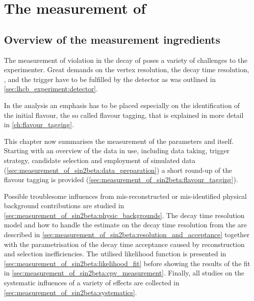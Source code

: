 
\chapter[
  head={The measurement of \sintwobetait},
  tocentry={The measurement of \sintwobetabfsfHyperref}
]
{The measurement of \sintwobetabfsf}
\label{ch:measurement_of_sin2beta}

\section{Overview of the measurement ingredients}
\label{sec:measurement_of_sin2beta:overview}

The measurement of \CP violation in the decay of \BdToJpsiKS poses a variety of
challenges to the experimenter. Great demands on the vertex resolution, the
decay time resolution, \PID, and the trigger have to be fulfilled by the \LHCb
detector as was outlined in \cref{sec:lhcb_experiment:detector}.

In the analysis an emphasis has to be placed especially on the identification of
the initial \Bmeson flavour, the so called flavour tagging, that is explained in
more detail in \cref{ch:flavour_tagging}.

This chapter now summarises the measurement of the \CP parameters \SJpsiKS and
\CJpsiKS itself. Starting with an overview of the data in use, including data
taking, trigger strategy, candidate selection and employment of simulated data
(\cref{sec:measurement_of_sin2beta:data_preparation}) a short round-up of the
flavour tagging is provided (\cref{sec:measurement_of_sin2beta:flavour_tagging}). 

Possible troublesome influences from mis-reconstructed or mis-identified
physical background contributions are studied in
\cref{sec:measurement_of_sin2beta:physic_backgrounds}. The decay time resolution
model and how to handle the estimate on the decay time resolution from the \DTF
are described in
\cref{sec:measurement_of_sin2beta:resolution_and_acceptance} together with
the parametrisation of the decay time acceptance caused by reconstruction and
selection inefficiencies. The utilised likelihood function is presented in
\cref{sec:measurement_of_sin2beta:likelihood_fit} before showing the results of
the fit in \cref{sec:measurement_of_sin2beta:cpv_measurement}. Finally, all
studies on the systematic influences of a variety of effects are collected in
\cref{sec:measurement_of_sin2beta:systematics}.

